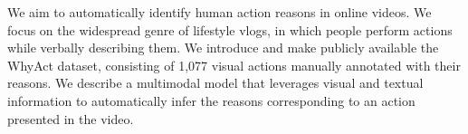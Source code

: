 We aim to automatically identify human action reasons in online videos. We focus on the widespread genre of lifestyle vlogs, in which people perform actions while verbally describing them. We introduce and make publicly available the WhyAct dataset, consisting of 1,077 visual actions manually annotated with their reasons. We describe a multimodal model that leverages visual and textual information to automatically infer the reasons corresponding to an action presented in the video.
